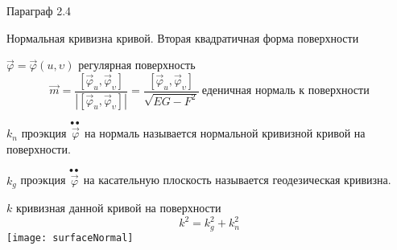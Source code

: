 \begin{title}[\Large]
  Параграф 2.4
\end{title}

\begin{title}[\Large]
  Нормальная кривизна кривой. Вторая квадратичная форма поверхности
\end{title}

\begin{define}
  $\vec \varphi = \vec \varphi(u, \upsilon)$ регулярная поверхность
  $$
  \vec m = \frac{[\vec \varphi_u, \vec \varphi_{\upsilon}]}{|[\vec \varphi_u,
  \vec \varphi_{\upsilon}]|} = \frac{[\vec \varphi_u, \vec \varphi_{\upsilon}]}
  {\sqrt{EG - F^2}} ~ \text{еденичная нормаль к поверхности}
  $$
\end{define}

\begin{define}
  $k_n$ проэкция $\stackrel{\bullet \bullet}{\vec \varphi}$ на нормаль
  называется нормальной кривизной кривой на поверхности.

  $k_g$ проэкция $\stackrel{\bullet \bullet}{\vec \varphi}$ на касательную
  плоскость называется геодезическая кривизна.

  $k$ кривизная данной кривой на поверхности
  $$
  k^2 = k_g^2 + k_n^2
  $$
  \texttt{[image: surfaceNormal]}
\end{define}

